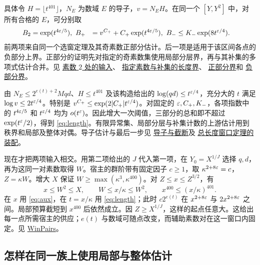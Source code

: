 \documentclass[UTF8,fontset=none,a4paper,11pt]{ctexart}
\theoremstyle{definition}
\newcommand{\src}[3]{\href{https://github.com/leanprover-community/riemann-hypothesis/blob/23aebbb302010b292314d406aa97f7901d698634/src/#1.lean\#L#2}{#3}}
\begin{document}
具体令 $H=\lfloor t^{401}\rfloor$，$N_E$ 为数域 $E$ 的导子，$v=N_EH$。在同一个 $[Y,Y^2]$ 中，对所有合格的 $E$，可分别取
\begin{align*}
 B_2&=\exp(t^{4\varepsilon/5}),\
 B_+&=v^{C_+}+C_+\exp(t^{4\varepsilon/5}),\
 B_-&\le K_-\exp(8t^{\varepsilon/4}).
\end{align*}
前两项来自同一个选窗定理及其奇素数正部分估计。后一项是适用于该区间各点的负部分上界。正部分的证明先对指定的奇素数集使用局部分层界，再与其补集的多项式估计合并。见
\src{Development/AutomorphicArithmetic/AutomorphicVarieties/PrimeSetBoundDataOfPrimitiveChar}{32}{素数 $2$ 处的输入}、
\src{Development/AutomorphicArithmetic/AutomorphicVarieties/HeightAndVanishing/LayerLe}{27}{指定素数与补集的长度界}、
\src{Development/AutomorphicArithmetic/AutomorphicVarieties/PrimeSetBoundDataOfPrimitiveChar}{75}{正部分界}和
\src{Development/AutomorphicArithmetic/AutomorphicVarieties/CMFieldExponentialBounds/minusle}{6}{负部分界}。

由 $N_E\le 2^{e(t)+2}Mqd$、$H\le t^{401}$ 及该构造给出的 $\log(qd)\le t^{\varepsilon/4}$，充分大的 $t$ 满足 $\log v\le 2t^{\varepsilon/4}$。特别是 $v^{C_+}\le\exp(2|C_+|t^{\varepsilon/4})$。对固定的 $\varepsilon,C_+,K_-$，各项指数中的 $t^{4\varepsilon/5}$ 和 $t^{\varepsilon/4}$ 均为 $o(t^\varepsilon)$。因此增大一次阈值，三部分的总和即不超过 $\exp(t^\varepsilon/2)$，得到 \eqref{eq:length}。有限异常集、局部分层与补集计数的上游估计用到秩界和局部及整体对偶。导子估计与最后一步见
\src{Development/AutomorphicArithmetic/AutomorphicVarieties/CMFieldExponentialBounds/LogConductorMulHeightLeOfPageN}{6}{导子与截断}及
\src{Development/AutomorphicArithmetic/AutomorphicVarieties/CMFieldExponentialBounds/AdmissibleOfPageN}{41}{总长度窗口定理的装配}。

现在才把两项输入相交。用第二项给出的 $J$ 代入第一项，在 $Y_0=X^{1/J}$ 选择 $q,d$，再为这同一对素数取得 $W$。宿主的群阶带有固定因子 $c\ge1$，取 $\kappa^{2+8\varepsilon}=c$，$Z=\kappa W$。增大 $X$ 保证 $W\ge\max(\kappa^3,\kappa^{400})$。对 $Z\le x\le Z^{3/2}$，有
\[
 x\le W^2\le X,\qquad W\le x/\kappa\le W^2,\qquad
 x^{400}\le(x/\kappa)^{401}.
\]
在 $x$ 用 \eqref{eq:aux}，在 $t=x/\kappa$ 用 \eqref{eq:length}；此时 $c2^{e(t)}$ 在 $x^{2+8\varepsilon}$ 与 $2x^{2+8\varepsilon}$ 之间。局部预算截短到 $x^{400}$ 后依然成立。因 $Z\ge X^{1/J}$，这样的起点任意大。这给出每一点所需宿主的供应；$e(t)$ 与数域可随点改变，而辅助素数对在这一窗口内固定。见 \src{Development/AutomorphicArithmetic/CharacterBoxes/WinPairs}{34}{WinPairs}。

\subsection{怎样在同一族上使用局部与整体估计}
\end{document}
